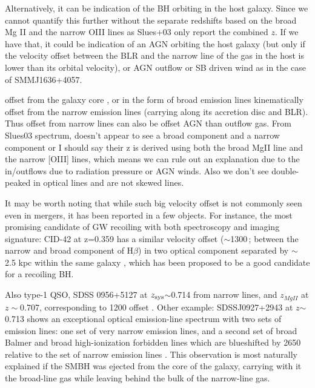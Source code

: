 \documentclass[]{emulateapj}
\begin{document}
Alternatively, it can be indication of the BH orbiting in the host galaxy. Since we cannot quantify this further without the separate redshifts based on the broad Mg II and the narrow OIII lines as Slues+03 only report the combined $z$. If we have that, it could be indication of an AGN orbiting the host galaxy (but only if the velocity offset between the BLR and the narrow line of the gas in the host is lower than its orbital velocity), or AGN outflow or SB driven wind as in the case of SMMJ1636+4057\citep{Swinbank05a}.

offset from the galaxy core \citep{Madau04a},
or in the form of broad emission lines kinematically
offset from the narrow emission lines \citep{Bonning07a} (\ie carrying along its accretion disc and BLR). Thus offset from narrow lines can also be offset AGN than outflow gas.
From Slues03 spectrum, doesn't appear to see a broad component and a narrow component or I should say their z is derived using both the broad MgII line and the narrow [OIII] lines, which means we can rule out an explanation due to the in/outflows due to radiation pressure or AGN winds.
Also we don't see double-peaked in optical lines and are not skewed lines.

It may be worth noting that while such big velocity offset is not commonly
seen even in mergers, it has been reported in a few objects. For instance,
the most promising candidate of GW recoiling with both spectroscopy and imaging
signature:
CID-42 at z=0.359 has a similar velocity offset ($\sim$1300\,\kms; between the narrow and broad component of H$\beta$) in two
optical component separated by $\sim$ 2.5 kpc within the same galaxy \citep{Civano10a}, which has been proposed to
be a good candidate for a recoiling BH.

Also type-1 QSO, SDSS 0956+5127 at $z_{\rm sys}$$\sim$0.714 from narrow lines, and $z_{Mg II}$ at $z\sim$0.707, corresponding to 1200 \kms offset \citep{Steinhardt12a}.
Other example:
SDSSJ0927+2943 at $z$$\sim$0.713 shows an exceptional optical emission-line spectrum with two
sets of emission lines: one set of very narrow emission lines, and a second set of broad Balmer and
broad high-ionization forbidden lines which are blueshifted by 2650 \kms
relative to the set of narrow emission lines \citep{Komossa08a}.
This observation is most naturally explained if the SMBH was ejected from the core
of the galaxy, carrying with it the broad-line gas while leaving behind the bulk of the narrow-line
gas.
\end{document}
